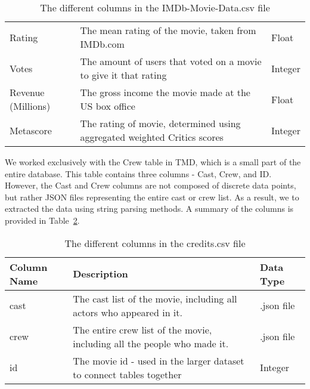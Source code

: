 \begin{table}[h]
\begin{tabular}{lp{10cm}l}
                Rating             & The mean rating of the movie, taken from IMDb.com                          & Float     \\
                Votes              & The amount of users that voted on a movie to give it that rating           & Integer   \\
                Revenue (Millions) & The gross income the movie made at the US box office                       & Float     \\
                Metascore          & The rating of movie, determined using aggregated weighted Critics scores   & Integer   \\
                \bottomrule
            \end{tabular}
            \caption[short]{The different columns in the IMDb-Movie-Data.csv file}\label{tab-IMDb-Movie-Data-Column-Description}
        \end{table}

        We worked exclusively with the Crew table in TMD, which is a small part of the
            entire database.
        This table contains three columns - Cast, Crew, and ID.
        However, the Cast and Crew columns are not composed of discrete data points,
            but rather JSON files representing the entire cast or crew list.
        As a result, we to extracted the data using string parsing methods.
        A summary of the columns is provided in
            Table~\ref{tab-Credits-Column-Description}.
        \begin{table}[h]
            \centering
            \begin{tabular}{lp{10cm}l}
                \toprule
                Column Name & Description                                                              & Data Type  \\
                \midrule
                cast        & The cast list of the movie, including all actors who appeared in it.     & .json file \\
                crew        & The entire crew list of the movie, including all the people who made it. & .json file \\
                id          & The movie id - used in the larger dataset to connect tables together     & Integer    \\
                \bottomrule
            \end{tabular}
            \caption[short]{The different columns in the credits.csv file}\label{tab-Credits-Column-Description}
        \end{table}

